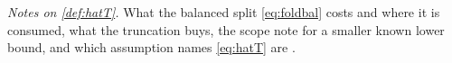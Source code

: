 \noindent\emph{Notes on \cref{def:hatT}.} What the balanced split \eqref{eq:foldbal} costs and where it is
consumed, what the truncation buys, the scope note for a smaller known lower bound, and which assumption
names \eqref{eq:hatT} are .

%
%
%
